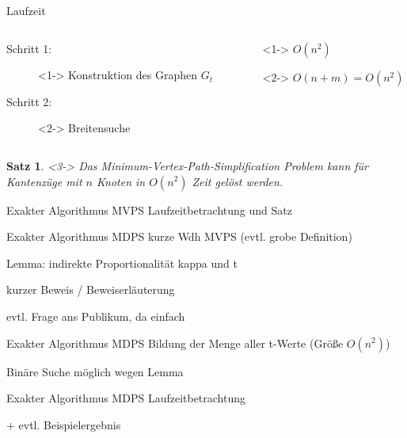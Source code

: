 \documentclass{beamer}
\newtheorem{thm}{Satz}
\begin{document}
	\begin{frame}{Laufzeit}
		\begin{columns}
			\begin{column}{0.6\linewidth}
				\begin{description}
					\item[Schritt 1:]<1-> Konstruktion des Graphen $G_t$
					\item[Schritt 2:]<2-> Breitensuche
				\end{description}
			\end{column}
			\begin{column}{0.5\linewidth}
				\begin{description}
					\item[]<1-> $O(n^2)$
					\item[]<2-> $O(n + m) = O(n^2)$
				\end{description}
			\end{column}
		\end{columns}
		\begin{thm}<3->
			Das Minimum-Vertex-Path-Simplification Problem kann für Kantenzüge mit $n$ Knoten in $O(n^2)$ Zeit gelöst werden.
		\end{thm}
	\end{frame}
	
	\begin{frame}{Exakter Algorithmus MVPS}
		Laufzeitbetrachtung und Satz
	\end{frame}
	
	\begin{frame}{Exakter Algorithmus MDPS}
		kurze Wdh MVPS (evtl. grobe Definition)
		
		Lemma: indirekte Proportionalität kappa und t
		
		kurzer Beweis / Beweiserläuterung
		
		evtl. Frage ans Publikum, da einfach
	\end{frame}
	
	\begin{frame}{Exakter Algorithmus MDPS}
		Bildung der Menge aller t-Werte (Größe $O(n^2)$)
		
		Binäre Suche möglich wegen Lemma
		
	\end{frame}
	
	\begin{frame}{Exakter Algorithmus MDPS}
		Laufzeitbetrachtung
		
		+ evtl. Beispielergebnis
	\end{frame}
	
\end{document}
